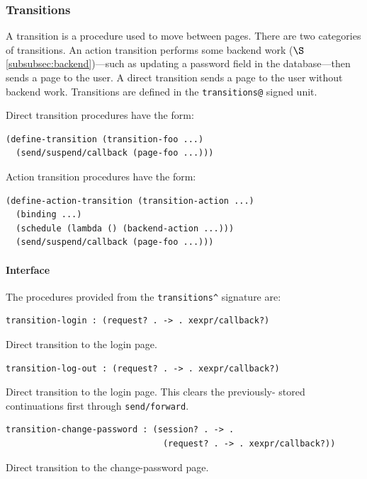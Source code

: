 \documentclass[a4paper]{article}
\begin{document}
\subsubsection{Transitions}\label{subsubsec:transitions}

A transition is a procedure used to move between pages. There are two categories
of transitions. An action transition performs some backend work
($\S$\ref{subsubsec:backend})---such as updating a password field in the
database---then sends a page to the user. A direct transition sends a page to
the user without backend work. Transitions are defined in the
\verb|transitions@| signed unit.

Direct transition procedures have the form:

\begin{verbatim}
(define-transition (transition-foo ...)
  (send/suspend/callback (page-foo ...)))
\end{verbatim}

Action transition procedures have the form:

\begin{verbatim}
(define-action-transition (transition-action ...)
  (binding ...)
  (schedule (lambda () (backend-action ...)))
  (send/suspend/callback (page-foo ...)))
\end{verbatim}

\paragraph{Interface}\label{para:transitions-interface}

The procedures provided from the \verb|transitions^| signature are:

\begin{verbatim}
transition-login : (request? . -> . xexpr/callback?)
\end{verbatim}
Direct transition to the login page.

\begin{verbatim}
transition-log-out : (request? . -> . xexpr/callback?)
\end{verbatim}
Direct transition to the login page. This clears the previously-
stored continuations first through \verb|send/forward|.

\begin{verbatim}
transition-change-password : (session? . -> .
                               (request? . -> . xexpr/callback?))
\end{verbatim}
Direct transition to the change-password page.
\end{document}
